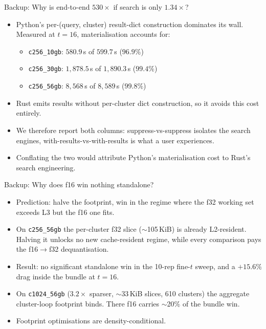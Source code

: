 \documentclass[aspectratio=169,10pt]{beamer}
\begin{document}
\begin{frame}{Backup: Why is end-to-end $530\times$ if search is only $1.34\times$?}
  \begin{itemize}
    \item Python's per-(query, cluster) result-dict construction dominates its wall. Measured at $t{=}16$, materialisation accounts for:
    \begin{itemize}
      \item \texttt{c256\_10gb}: $580.9$\,s of $599.7$\,s ($96.9\%$)
      \item \texttt{c256\_30gb}: $1{,}878.5$\,s of $1{,}890.3$\,s ($99.4\%$)
      \item \texttt{c256\_56gb}: $8{,}568$\,s of $8{,}589$\,s ($99.8\%$)
    \end{itemize}
    \item Rust emits results without per-cluster dict construction, so it avoids this cost entirely.
    \item We therefore report both columns: suppress-vs-suppress isolates the search engines, with-results-vs-with-results is what a user experiences.
    \item Conflating the two would attribute Python's materialisation cost to Rust's search engineering.
  \end{itemize}
\end{frame}

\begin{frame}{Backup: Why does f16 win nothing standalone?}
  \begin{itemize}
    \item Prediction: halve the footprint, win in the regime where the f32 working set exceeds L3 but the f16 one fits.
    \item On \texttt{c256\_56gb} the per-cluster f32 slice ($\sim$105\,KiB) is already L2-resident. Halving it unlocks no new cache-resident regime, while every comparison pays the f16$\to$f32 dequantisation.
    \item Result: no significant standalone win in the 10-rep fine-$t$ sweep, and a $+15.6\%$ drag inside the bundle at $t{=}16$.
    \item On \texttt{c1024\_56gb} ($3.2\times$ sparser, $\sim$33\,KiB slices, 610 clusters) the aggregate cluster-loop footprint binds. There f16 carries $\sim$20\% of the bundle win.
    \item Footprint optimisations are density-conditional.
  \end{itemize}
\end{frame}
\end{document}

